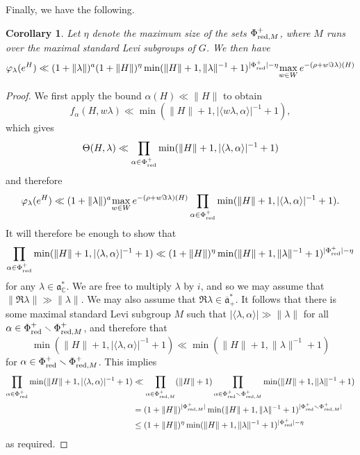 \documentclass[12pt]{amsart}
\newtheorem{cor}[theorem]{Corollary}
\theoremstyle{remark}
\newcommand{\C}{\mathbb C}
\newcommand{\ga}{\mathfrak a}
\begin{document}
Finally, we have the following.


\begin{cor}


Let $\eta$ denote the maximum size of the sets $\Phi^+_{\textnormal{red},M}$, where $M$ runs over the maximal standard Levi subgroups of $G$.  We then have
\[
\varphi_\lambda(e^H) \ll (1 + \| \lambda \|)^a (1 + \| H \|)^{ \eta} \min( \| H \| + 1, \| \lambda \|^{-1} + 1)^{|\Phi_\textnormal{red}^+| - \eta} \underset{w \in W}{\max} \, e^{-(\rho + w \Im \lambda)(H) }
\]
\end{cor}

\begin{proof}
We first apply the bound $\alpha(H) \ll \| H \|$ to obtain
\[
f_\alpha(H,w\lambda) \ll \min( \| H \| + 1, |\langle w\lambda, \alpha \rangle|^{-1} + 1),
\]
which gives
\[
\Theta(H,\lambda) \ll \prod_{\alpha \in \Phi_\textnormal{red}^+} \min( \| H \| + 1, |\langle \lambda, \alpha \rangle|^{-1} + 1)
\]
and therefore
\[
\varphi_\lambda(e^H) \ll (1 + \| \lambda \|)^a \underset{w \in W}{\max} \, e^{-(\rho + w \Im \lambda)(H) } \prod_{\alpha \in \Phi_\textnormal{red}^+} \min( \| H \| + 1, |\langle \lambda, \alpha \rangle|^{-1} + 1).
\]
It will therefore be enough to show that
\[
\prod_{\alpha \in \Phi_\textnormal{red}^+} \min( \| H \| + 1, |\langle \lambda, \alpha \rangle|^{-1} + 1) \ll (1 + \| H \|)^{ \eta} \min( \| H \| + 1, \| \lambda \|^{-1} + 1)^{|\Phi_\textnormal{red}^+| - \eta}
\]
for any $\lambda \in \ga^*_\C$.  We are free to multiply $\lambda$ by $i$, and so we may assume that $\| \Re \lambda \| \gg \| \lambda \|$.  We may also assume that $\Re \lambda \in \overline{\ga}^*_+$.  It follows that there is some maximal standard Levi subgroup $M$ such that $|\langle \lambda, \alpha \rangle| \gg \| \lambda \|$ for all $\alpha \in \Phi_\textnormal{red}^+ \smallsetminus \Phi^+_{\textnormal{red},M}$, and therefore that
\[
\min( \| H \| + 1, |\langle \lambda, \alpha \rangle|^{-1} + 1) \ll \min( \| H \| + 1, \| \lambda \|^{-1} + 1)
\]
for $\alpha \in \Phi_\textnormal{red}^+ \smallsetminus \Phi^+_{\textnormal{red},M}$.  This implies
\begin{align*}
\prod_{\alpha \in \Phi_\textnormal{red}^+} \min( \| H \| + 1, |\langle \lambda, \alpha \rangle|^{-1} + 1) & \ll \prod_{\alpha \in \Phi^+_{\textnormal{red},M}} (\| H \| + 1) \prod_{\alpha \in \Phi_\textnormal{red}^+ \smallsetminus \Phi^+_{\textnormal{red},M}} \min( \| H \| + 1, \| \lambda \|^{-1} + 1) \\
& = (1 + \| H \|)^{ |\Phi^+_{\textnormal{red},M}|} \min( \| H \| + 1, \| \lambda \|^{-1} + 1)^{|\Phi_\textnormal{red}^+ \smallsetminus \Phi^+_{\textnormal{red}, M}|} \\
& \le (1 + \| H \|)^\eta \min( \| H \| + 1, \| \lambda \|^{-1} + 1)^{|\Phi_\textnormal{red}^+| - \eta}
\end{align*}
%
as required.
\end{proof}
\end{document}
